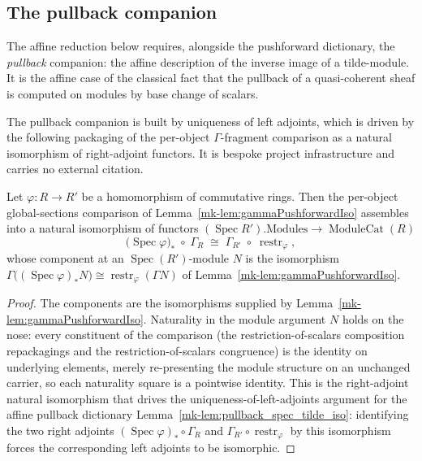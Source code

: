 \subsection{The pullback companion}

The affine reduction below requires, alongside the pushforward dictionary, the
\emph{pullback} companion: the affine description of the inverse image of a
tilde-module. It is the affine case of the classical fact that the pullback of a
quasi-coherent sheaf is computed on modules by base change of scalars.

The pullback companion is built by uniqueness of left adjoints, which is driven by
the following packaging of the per-object \(\Gamma\)-fragment comparison as a
natural isomorphism of right-adjoint functors. It is bespoke project
infrastructure and carries no external citation.

\begin{lemma}\label{mk-lem:gammaPushforwardNatIso}
  \leanok

  Let \(\varphi : R \to R'\) be a homomorphism of commutative rings. Then the
  per-object global-sections comparison of
  Lemma~\ref{mk-lem:gammaPushforwardIso} assembles into a natural isomorphism of
  functors \((\operatorname{Spec} R').\mathrm{Modules} \to \operatorname{ModuleCat}(R)\)
  \[
    \bigl(\operatorname{Spec}\varphi\bigr)_* \;\circ\; \Gamma_R
    \;\cong\;
    \Gamma_{R'} \;\circ\; \operatorname{restr}_\varphi ,
  \]
  whose component at an \(\operatorname{Spec}(R')\)-module \(N\) is the isomorphism
  \(\Gamma\bigl((\operatorname{Spec}\varphi)_* N\bigr) \cong
  \operatorname{restr}_\varphi(\Gamma N)\) of
  Lemma~\ref{mk-lem:gammaPushforwardIso}.
\end{lemma}

\begin{proof}
  \leanok
  The components are the isomorphisms supplied by
  Lemma~\ref{mk-lem:gammaPushforwardIso}. Naturality in the module argument \(N\)
  holds on the nose: every constituent of the comparison
  (the restriction-of-scalars composition repackagings and the
  restriction-of-scalars congruence) is the identity on underlying elements,
  merely re-presenting the module structure on an unchanged carrier, so each
  naturality square is a pointwise identity. This is the right-adjoint natural
  isomorphism that drives the uniqueness-of-left-adjoints argument for the affine
  pullback dictionary Lemma~\ref{mk-lem:pullback_spec_tilde_iso}: identifying the two
  right adjoints \((\operatorname{Spec}\varphi)_* \circ \Gamma_R\) and
  \(\Gamma_{R'} \circ \operatorname{restr}_\varphi\) by this isomorphism forces the
  corresponding left adjoints to be isomorphic.
\end{proof}

